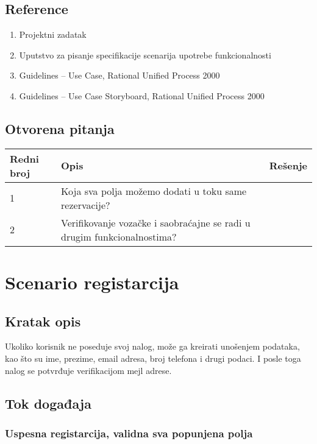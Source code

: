 \documentclass[12pt]{article}
\begin{document}
\subsection{Reference}
\begin{enumerate}
   \item Projektni zadatak
   \item Uputstvo za pisanje specifikacije scenarija upotrebe funkcionalnosti
   \item  Guidelines – Use Case, Rational Unified Process 2000
   \item  Guidelines – Use Case Storyboard, Rational Unified Process 2000
 \end{enumerate}
\subsection{Otvorena pitanja}


\begin{center}
\begin{tabular}{ | m{2cm} | m{7cm}| m{7cm} | } 
\hline
Redni broj& Opis & Rešenje \\ 
\hline
1 & Koja sva polja možemo dodati u toku same rezervacije? & \\
\hline
2 & Verifikovanje vozačke i saobraćajne se radi u drugim funkcionalnostima? & \\
\hline
\end{tabular}
\end{center}

    

\section{Scenario registarcija}
\subsection{Kratak opis}
Ukoliko korisnik ne poseduje svoj nalog, može ga kreirati unošenjem
podataka, kao što su ime, prezime, email adresa, broj telefona i drugi podaci. I posle toga nalog se potvrđuje verifikacijom mejl adrese.
\subsection{Tok događaja}

\subsubsection{Uspesna registarcija, validna sva popunjena polja}
\end{document}
